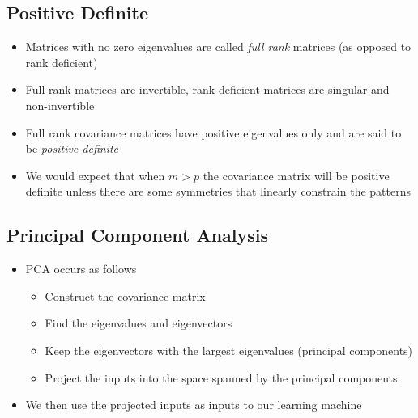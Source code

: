 
\begin{slide}
\section{Positive Definite}

\begin{PauseHighLight}

\begin{itemize}
\item Matrices with no zero eigenvalues are called \emph{full rank}
  matrices (as opposed to rank deficient)\pause
\item Full rank matrices are invertible, rank deficient matrices are
  singular and non-invertible\pause
\item Full rank covariance matrices have positive eigenvalues only and are
  said to be \emph{positive definite}\pause
\item We would expect that when $m>p$ the covariance matrix will be
  positive definite\pause{} unless there are some symmetries that linearly constrain the
  patterns\pauseb
\end{itemize}

\end{PauseHighLight}
\end{slide}

\Outline %

\begin{slide}
\section{Principal Component Analysis}

\begin{PauseHighLight}

\begin{itemize}\squeeze
\item PCA occurs as follows\pause
  \begin{itemize}
  \item Construct the covariance matrix\pause
  \item Find the eigenvalues and eigenvectors\pause
  \item Keep the eigenvectors with the largest eigenvalues (principal
    components)\pause
  \item Project the inputs into the space spanned by the principal
    components \pause
  \end{itemize}
\item  We then use the projected inputs as inputs to our learning
  machine\pause
\end{itemize}

\end{PauseHighLight}
\end{slide}

